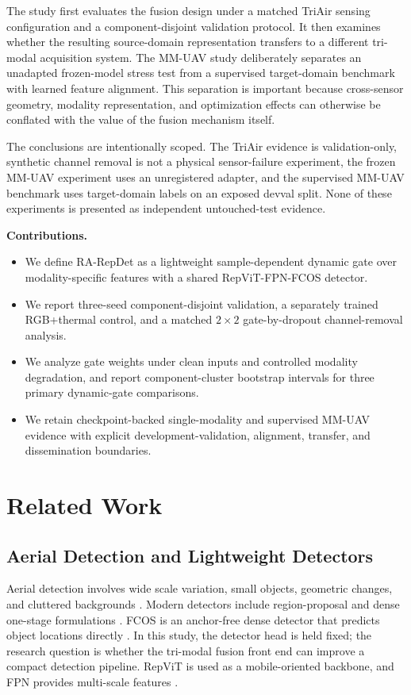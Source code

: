 \documentclass[pdflatex,sn-basic,Numbered,iicol]{sn-jnl}
\begin{document}
The study first evaluates the fusion design under a matched TriAir sensing configuration and a component-disjoint validation protocol. It then examines whether the resulting source-domain representation transfers to a different tri-modal acquisition system. The MM-UAV study deliberately separates an unadapted frozen-model stress test from a supervised target-domain benchmark with learned feature alignment. This separation is important because cross-sensor geometry, modality representation, and optimization effects can otherwise be conflated with the value of the fusion mechanism itself.

The conclusions are intentionally scoped. The TriAir evidence is validation-only, synthetic channel removal is not a physical sensor-failure experiment, the frozen MM-UAV experiment uses an unregistered adapter, and the supervised MM-UAV benchmark uses target-domain labels on an exposed devval split. None of these experiments is presented as independent untouched-test evidence.

\noindent\textbf{Contributions.}
\begin{itemize}
    \item We define RA-RepDet as a lightweight sample-dependent dynamic gate over modality-specific features with a shared RepViT-FPN-FCOS detector.
    \item We report three-seed component-disjoint validation, a separately trained RGB+thermal control, and a matched $2\times2$ gate-by-dropout channel-removal analysis.
    \item We analyze gate weights under clean inputs and controlled modality degradation, and report component-cluster bootstrap intervals for three primary dynamic-gate comparisons.
    \item We retain checkpoint-backed single-modality and supervised MM-UAV evidence with explicit development-validation, alignment, transfer, and dissemination boundaries.
\end{itemize}

\section{Related Work}
\subsection{Aerial Detection and Lightweight Detectors}
Aerial detection involves wide scale variation, small objects, geometric changes, and cluttered backgrounds \cite{cheng2016survey,zhu2017deepRS,xia2022dota}. Modern detectors include region-proposal and dense one-stage formulations \cite{ren2017faster,lin2020focal}. FCOS is an anchor-free dense detector that predicts object locations directly \cite{tian2019fcos}. In this study, the detector head is held fixed; the research question is whether the tri-modal fusion front end can improve a compact detection pipeline. RepViT is used as a mobile-oriented backbone, and FPN provides multi-scale features \cite{wang2024repvit,lin2017fpn}.
\end{document}
